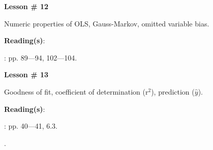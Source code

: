 \documentclass[letterpaper]{article}
\renewenvironment{itemize}{
  \begin{list}{}{
    \setlength{\leftmargin}{1.5em}
  }
}{
  \end{list}
}
\begin{document}
\begin{enumerate}



			\begin{itemize} 
				\item[$\bullet$] {\bf Lesson \# 12} %
					\begin{itemize} 
						\item[$\circ$] Numeric properties of OLS, Gauss-Markov, omitted variable bias. %
						\item[$\circ$] {\bf Reading(s)}: 
							\begin{itemize} 
								\item[$\diamond$] \textcite{Wooldridge2002}: pp. 89---94, 102---104.
							\end{itemize}
					\end{itemize}
			\end{itemize}



			\begin{itemize} 
				\item[$\bullet$] {\bf Lesson \# 13} %
					\begin{itemize} 
						\item[$\circ$] Goodness of fit, coefficient of determination (r$^2$), prediction ($\hat y$). 
						\item[$\circ$] {\bf Reading(s)}:
							\begin{itemize} 
								\item[$\diamond$] \textcite{Wooldridge2002}: pp. 40---41, 6.3.
								\item[$\diamond$] .


\end{itemize}
\end{itemize}
\end{itemize}
\end{enumerate}
\end{document}
